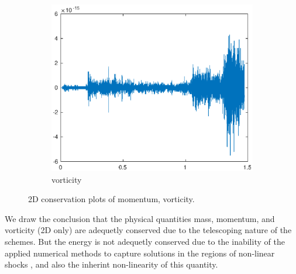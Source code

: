 \begin{figure}[h!]
\begin{subfigure}[b]{0.9\textwidth}
        \centering
        \includegraphics[width=1.1\textwidth,height=0.52\textwidth]{images/cons_vort.eps}\hfill
        \caption{vorticity}
        \label{Momentum}
    \end{subfigure}
    \caption{2D conservation plots of momentum, vorticity.}
    \label{fig:2Dcons_B}
\end{figure}

We draw the conclusion that the physical quantities mass, momentum, and vorticity (2D only) are adequetly conserved due to the telescoping nature of the schemes.
But the energy is not adequetly conserved due to the inability of the applied numerical methods to capture solutions in the regions of non-linear shocks \cite{Lax}, and also the 
inherint non-linearity of this quantity. 
